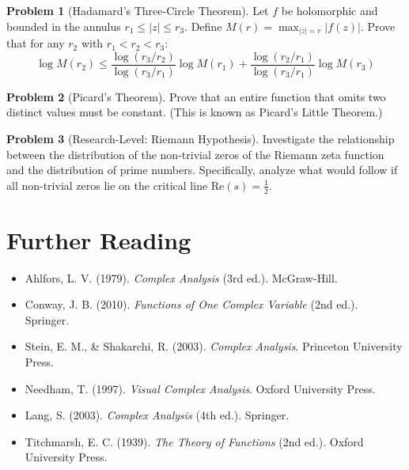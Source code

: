 \documentclass[12pt,a4paper]{article}
\theoremstyle{plain}
\theoremstyle{definition}
\newtheorem{problem}{Problem}[section]
\begin{document}
\begin{problem}[Hadamard's Three-Circle Theorem]
Let $f$ be holomorphic and bounded in the annulus $r_1 \leq |z| \leq r_3$. Define $M(r) = \max_{|z|=r} |f(z)|$. Prove that for any $r_2$ with $r_1 < r_2 < r_3$:
\[\log M(r_2) \leq \frac{\log(r_3/r_2)}{\log(r_3/r_1)} \log M(r_1) + \frac{\log(r_2/r_1)}{\log(r_3/r_1)} \log M(r_3)\]
\end{problem}

\begin{problem}[Picard's Theorem]
Prove that an entire function that omits two distinct values must be constant. (This is known as Picard's Little Theorem.)
\end{problem}

\begin{problem}[Research-Level: Riemann Hypothesis]
Investigate the relationship between the distribution of the non-trivial zeros of the Riemann zeta function and the distribution of prime numbers. Specifically, analyze what would follow if all non-trivial zeros lie on the critical line $\text{Re}(s) = \frac{1}{2}$.
\end{problem}

\section{Further Reading}

\begin{itemize}
\item Ahlfors, L. V. (1979). \textit{Complex Analysis} (3rd ed.). McGraw-Hill.
\item Conway, J. B. (2010). \textit{Functions of One Complex Variable} (2nd ed.). Springer.
\item Stein, E. M., \& Shakarchi, R. (2003). \textit{Complex Analysis}. Princeton University Press.
\item Needham, T. (1997). \textit{Visual Complex Analysis}. Oxford University Press.
\item Lang, S. (2003). \textit{Complex Analysis} (4th ed.). Springer.
\item Titchmarsh, E. C. (1939). \textit{The Theory of Functions} (2nd ed.). Oxford University Press.
\end{itemize}
\end{document}
